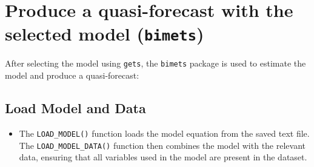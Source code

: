 \documentclass[
  letterpaper,
  DIV=11,
  numbers=noendperiod]{scrreport}
\newenvironment{Shaded}{\begin{snugshade}}{\end{snugshade}}
\newcommand{\AttributeTok}[1]{\textcolor[rgb]{0.40,0.45,0.13}{#1}}
\newcommand{\CommentTok}[1]{\textcolor[rgb]{0.37,0.37,0.37}{#1}}
\newcommand{\FunctionTok}[1]{\textcolor[rgb]{0.28,0.35,0.67}{#1}}
\newcommand{\NormalTok}[1]{\textcolor[rgb]{0.00,0.23,0.31}{#1}}
\newcommand{\OtherTok}[1]{\textcolor[rgb]{0.00,0.23,0.31}{#1}}
\newcommand{\SpecialCharTok}[1]{\textcolor[rgb]{0.37,0.37,0.37}{#1}}
\newcommand{\StringTok}[1]{\textcolor[rgb]{0.13,0.47,0.30}{#1}}
\providecommand{\tightlist}{%
  \setlength{\itemsep}{0pt}\setlength{\parskip}{0pt}}\usepackage{longtable,booktabs,array}
\begin{document}
\section{\texorpdfstring{Produce a quasi-forecast with the selected
model
(\texttt{bimets})}{Produce a quasi-forecast with the selected model (bimets)}}\label{produce-a-quasi-forecast-with-the-selected-model-bimets}

After selecting the model using \texttt{gets}, the \texttt{bimets}
package is used to estimate the model and produce a quasi-forecast:

\subsection{Load Model and Data}\label{load-model-and-data}

\begin{itemize}
\tightlist
\item
  The \texttt{LOAD\_MODEL()} function loads the model equation from the
  saved text file. The \texttt{LOAD\_MODEL\_DATA()} function then
  combines the model with the relevant data, ensuring that all variables
  used in the model are present in the dataset.
\end{itemize}

\begin{Shaded}
\end{Shaded}
\end{document}
